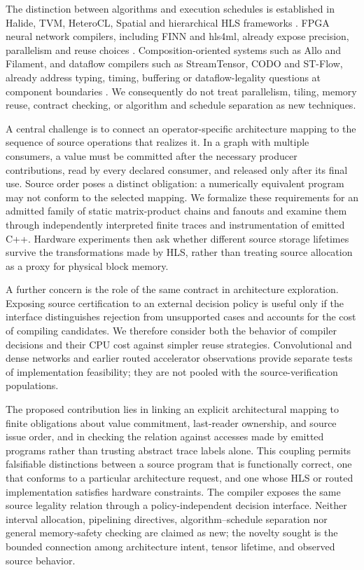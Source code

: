 \documentclass{article}
\begin{document}
The distinction between algorithms and execution schedules is established in Halide, TVM, HeteroCL, Spatial and hierarchical HLS frameworks \cite{halide2013,tvm2018,heterocl2019,spatial2018,scalehls2022,hida2024}. FPGA neural network compilers, including FINN and hls4ml, already expose precision, parallelism and reuse choices \cite{finn2017,finnr2018,hls4ml2018,hls4mlcnn2021}. Composition-oriented systems such as Allo and Filament, and dataflow compilers such as StreamTensor, CODO and ST-Flow, already address typing, timing, buffering or dataflow-legality questions at component boundaries \cite{allo2024,filament2023,streamtensor2025,codo2026,stflow2026}. We consequently do not treat parallelism, tiling, memory reuse, contract checking, or algorithm and schedule separation as new techniques.

A central challenge is to connect an operator-specific architecture mapping to the sequence of source operations that realizes it. In a graph with multiple consumers, a value must be committed after the necessary producer contributions, read by every declared consumer, and released only after its final use. Source order poses a distinct obligation: a numerically equivalent program may not conform to the selected mapping. We formalize these requirements for an admitted family of static matrix-product chains and fanouts and examine them through independently interpreted finite traces and instrumentation of emitted C++. Hardware experiments then ask whether different source storage lifetimes survive the transformations made by HLS, rather than treating source allocation as a proxy for physical block memory.

A further concern is the role of the same contract in architecture exploration. Exposing source certification to an external decision policy is useful only if the interface distinguishes rejection from unsupported cases and accounts for the cost of compiling candidates. We therefore consider both the behavior of compiler decisions and their CPU cost against simpler reuse strategies. Convolutional and dense networks and earlier routed accelerator observations provide separate tests of implementation feasibility; they are not pooled with the source-verification populations.

The proposed contribution lies in linking an explicit architectural mapping to finite obligations about value commitment, last-reader ownership, and source issue order, and in checking the relation against accesses made by emitted programs rather than trusting abstract trace labels alone. This coupling permits falsifiable distinctions between a source program that is functionally correct, one that conforms to a particular architecture request, and one whose HLS or routed implementation satisfies hardware constraints. The compiler exposes the same source legality relation through a policy-independent decision interface. Neither interval allocation, pipelining directives, algorithm--schedule separation nor general memory-safety checking are claimed as new; the novelty sought is the bounded connection among architecture intent, tensor lifetime, and observed source behavior.
\end{document}
